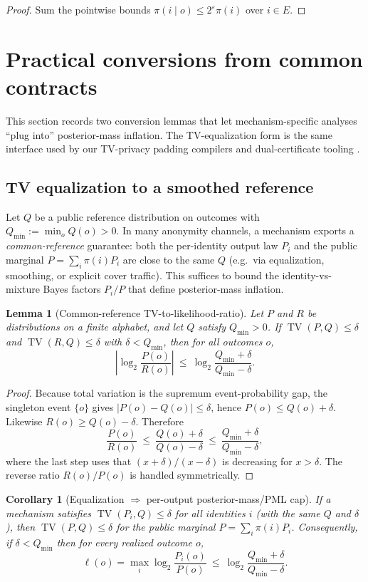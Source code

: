 \documentclass[11pt]{article}
\DeclareMathOperator{\TV}{TV}
\newtheorem{lemma}{Lemma}
\newtheorem{corollary}{Corollary}
\theoremstyle{definition}
\theoremstyle{remark}
\begin{document}
\begin{proof}
Sum the pointwise bounds $\pi(i\mid o)\le 2^{\varepsilon}\pi(i)$ over $i\in E$.
\end{proof}

\section{Practical conversions from common contracts}
This section records two conversion lemmas that let mechanism-specific analyses ``plug into'' posterior-mass inflation.
The TV-equalization form is the same interface used by our TV-privacy padding compilers and dual-certificate tooling \cite{series:knapsacktransport}.

\subsection{TV equalization to a smoothed reference}
Let $Q$ be a public reference distribution on outcomes with $Q_{\min}:=\min_o Q(o)>0$.
In many anonymity channels, a mechanism exports a \emph{common-reference} guarantee: both the per-identity output law $P_i$ and the public marginal $P=\sum_i \pi(i)P_i$ are close to the same $Q$ (e.g.\ via equalization, smoothing, or explicit cover traffic).
This suffices to bound the identity-vs-mixture Bayes factors $P_i/P$ that define posterior-mass inflation.

\begin{lemma}[Common-reference TV-to-likelihood-ratio]\label{lem:tv_to_lr}
Let $P$ and $R$ be distributions on a finite alphabet, and let $Q$ satisfy $Q_{\min}>0$.
If $\TV(P,Q)\le \delta$ and $\TV(R,Q)\le \delta$ with $\delta<Q_{\min}$, then for all outcomes $o$,
\[
\left|\log_2\frac{P(o)}{R(o)}\right|\ \le\ \log_2\frac{Q_{\min}+\delta}{Q_{\min}-\delta}.
\]
\end{lemma}

\begin{proof}
Because total variation is the supremum event-probability gap, the singleton event $\{o\}$ gives $|P(o)-Q(o)|\le\delta$, hence $P(o)\le Q(o)+\delta$.
Likewise $R(o)\ge Q(o)-\delta$.
Therefore
\[
\frac{P(o)}{R(o)}\ \le\ \frac{Q(o)+\delta}{Q(o)-\delta}
\ \le\ \frac{Q_{\min}+\delta}{Q_{\min}-\delta},
\]
where the last step uses that $(x+\delta)/(x-\delta)$ is decreasing for $x>\delta$.
The reverse ratio $R(o)/P(o)$ is handled symmetrically.
\end{proof}

\begin{corollary}[Equalization $\Rightarrow$ per-output posterior-mass/PML cap]\label{cor:eq_to_epsinf}
If a mechanism satisfies $\TV(P_i,Q)\le \delta$ for all identities $i$ (with the same $Q$ and $\delta$),
then $\TV(P,Q)\le \delta$ for the public marginal $P=\sum_i \pi(i)P_i$.
Consequently, if $\delta<Q_{\min}$ then for every realized outcome $o$,
\[
\ell(o)=\max_i \log_2\frac{P_i(o)}{P(o)}\ \le\ \log_2\frac{Q_{\min}+\delta}{Q_{\min}-\delta}.
\]
\end{corollary}
\end{document}
